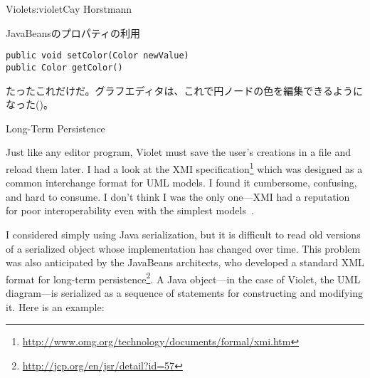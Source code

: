 \begin{aosachapter}{Violet}{s:violet}{Cay Horstmann}
\begin{aosasect1}{JavaBeansのプロパティの利用}
\begin{verbatim}
public void setColor(Color newValue)
public Color getColor()
\end{verbatim}

\noindent
たったこれだけだ。グラフエディタは、これで円ノードの色を編集できるようになった()。


\end{aosasect1}

\begin{aosasect1}{Long-Term Persistence}

Just like any editor program, Violet must save the user's creations in
a file and reload them later. I had a look at the XMI
specification\footnote{\url{http://www.omg.org/technology/documents/formal/xmi.htm}}
which was designed as a common interchange format for UML models. I
found it cumbersome, confusing, and hard to consume. I don't think I
was the only one---XMI had a reputation for poor interoperability even
with the simplest models~\cite{bib:persson:osstools}.

I considered simply using Java serialization, but it is difficult to
read old versions of a serialized object whose implementation has
changed over time.  This problem was also anticipated by the JavaBeans
architects, who developed a standard XML format for long-term
persistence\footnote{\url{http://jcp.org/en/jsr/detail?id=57}}.  A
Java object---in the case of Violet, the UML diagram---is serialized
as a sequence of statements for constructing and modifying it. Here is
an example:


\end{aosasect1}
\end{aosachapter}
